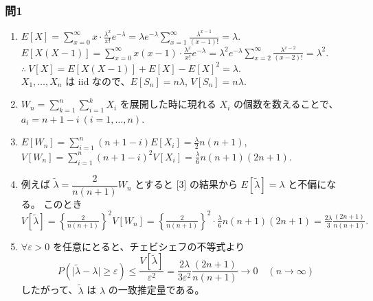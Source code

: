 \documentclass[./main.tex]{subfiles}
\begin{document}
    \subsubsection*{問1}

    \begin{enumerate}
        \item $E[X] = \displaystyle\sum_{x=0}^\infty x \cdot \frac{\lambda^x}{x!} e^{- \lambda}
            = \lambda e^{-\lambda} \sum_{x=1}^\infty \frac{\lambda^{x-1}}{(x - 1)!} = \lambda.$\\
        $E[X (X - 1)] = \displaystyle \sum_{x=0}^\infty x (x - 1) \cdot \frac{\lambda^x}{x!} e^{-\lambda}
            = \lambda^2 e^{-\lambda} \sum_{x=2}^\infty \frac{\lambda^{x - 2}}{(x - 2)!} = \lambda^2.$\\
        $\therefore \ V[X] = E[X (X - 1)] + E[X] - E[X]^2 = \lambda.$\\
        $X_1, \dots, X_n$ は iid なので、$E[S_n] = n \lambda$, $V[S_n] = n\lambda.$

        \item $\displaystyle W_n = \sum_{k=1}^n \sum_{i=1}^k X_i$ を展開した時に現れる $X_i$ の個数を数えることで、$a_i = n + 1 - i \ (i = 1, \dots, n)$.

        \item $E [W_n] = \displaystyle \sum_{i=1}^{n} (n + 1 - i) E [X_i] = \frac{\lambda}{2} n(n + 1)$,\\
        $V[W_n] = \displaystyle \sum_{i=1}^n (n + 1 - i)^2 V[X_i] = \frac{\lambda}{6} n (n + 1) (2n + 1).$

        \item 例えば $\displaystyle \tilde{\lambda} = \dfrac{2}{n(n+1)} W_n$ とすると [3] の結果から $E[\tilde{\lambda}] = \lambda$ と不偏になる。
        このとき\\
            $\displaystyle V[\tilde{\lambda}]
                = \left\{ \frac{2}{n (n + 1)} \right\}^2 V [W_n]
                = \left\{ \frac{2}{n (n + 1)} \right\}^2 \cdot \frac{\lambda}{6} n (n + 1) (2n + 1)
                = \frac{2 \lambda}{3} \frac{(2n + 1)}{n (n + 1)} .$
        
        \item $\forall \varepsilon > 0$ を任意にとると、チェビシェフの不等式より
        \begin{equation*}
            P (\vert \tilde{\lambda} - \lambda \vert \geq \varepsilon)
                \leq \frac{V[\tilde{\lambda}]}{\varepsilon^2}
                = \frac{2\lambda}{3 \varepsilon^2} \frac{(2n + 1)}{n (n + 1)} 
                \to 0 \quad (n \to \infty)
        \end{equation*}
        したがって、$\tilde{\lambda}$ は $\lambda$ の一致推定量である。


\end{enumerate}
\end{document}
